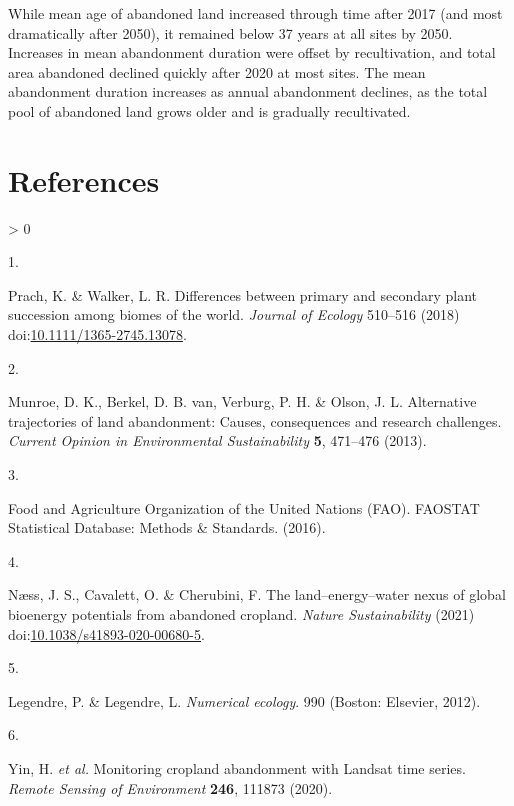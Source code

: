 \documentclass[
]{article}
\newlength{\cslhangindent}
\newlength{\csllabelwidth}
\newenvironment{CSLReferences}[2] %
 {%
  \setlength{\parindent}{0pt}
  \ifodd #1 \everypar{\setlength{\hangindent}{\cslhangindent}}\ignorespaces\fi
  \ifnum #2 > 0
  \setlength{\parskip}{#2\baselineskip}
  \fi
 }%
 {}
\newcommand{\CSLLeftMargin}[1]{\parbox[t]{\csllabelwidth}{#1}}
\newcommand{\CSLRightInline}[1]{\parbox[t]{\linewidth - \csllabelwidth}{#1}\break}
\begin{document}
While mean age of abandoned land increased through time after 2017 (and most dramatically after 2050), it remained below 37 years at all sites by 2050.
Increases in mean abandonment duration were offset by recultivation, and total area abandoned declined quickly after 2020 at most sites.
The mean abandonment duration increases as annual abandonment declines, as the total pool of abandoned land grows older and is gradually recultivated.

\newpage

\hypertarget{references}{%
\section*{References}\label{references}}

\hypertarget{refs}{}
\begin{CSLReferences}{0}{0}
\leavevmode\hypertarget{ref-Prach2018}{}%
\CSLLeftMargin{1. }
\CSLRightInline{Prach, K. \& Walker, L. R. {Differences between primary and secondary plant succession among biomes of the world}. \emph{Journal of Ecology} 510--516 (2018) doi:\href{https://doi.org/10.1111/1365-2745.13078}{10.1111/1365-2745.13078}.}

\leavevmode\hypertarget{ref-Munroe2013}{}%
\CSLLeftMargin{2. }
\CSLRightInline{Munroe, D. K., Berkel, D. B. van, Verburg, P. H. \& Olson, J. L. {Alternative trajectories of land abandonment: Causes, consequences and research challenges}. \emph{Current Opinion in Environmental Sustainability} \textbf{5}, 471--476 (2013).}

\leavevmode\hypertarget{ref-FAO2016}{}%
\CSLLeftMargin{3. }
\CSLRightInline{Food and Agriculture Organization of the United Nations (FAO). {FAOSTAT Statistical Database: Methods {\&} Standards}. (2016).}

\leavevmode\hypertarget{ref-Naess2021}{}%
\CSLLeftMargin{4. }
\CSLRightInline{Næss, J. S., Cavalett, O. \& Cherubini, F. {The land--energy--water nexus of global bioenergy potentials from abandoned cropland}. \emph{Nature Sustainability} (2021) doi:\href{https://doi.org/10.1038/s41893-020-00680-5}{10.1038/s41893-020-00680-5}.}

\leavevmode\hypertarget{ref-Legendre2012}{}%
\CSLLeftMargin{5. }
\CSLRightInline{Legendre, P. \& Legendre, L. \emph{{Numerical ecology}}. 990 (Boston: Elsevier, 2012).}

\leavevmode\hypertarget{ref-Yin2020}{}%
\CSLLeftMargin{6. }
\CSLRightInline{Yin, H. \emph{et al.} {Monitoring cropland abandonment with Landsat time series}. \emph{Remote Sensing of Environment} \textbf{246}, 111873 (2020).}


\end{CSLReferences}
\end{document}
